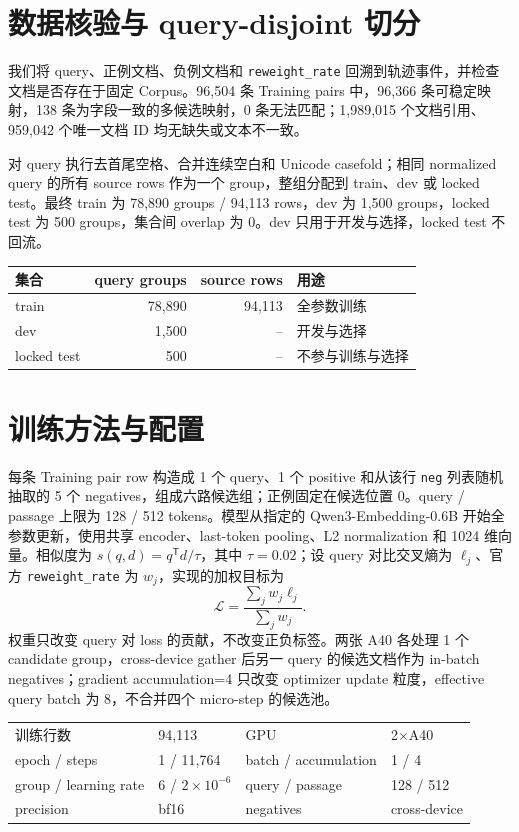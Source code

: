 \documentclass[UTF8,a4paper,10pt]{ctexart}
\begin{document}
\section{数据核验与 query-disjoint 切分}
我们将 query、正例文档、负例文档和 \texttt{reweight\_rate} 回溯到轨迹事件，并检查文档是否存在于固定 Corpus。96,504 条 Training pairs 中，96,366 条可稳定映射，138 条为字段一致的多候选映射，0 条无法匹配；1,989,015 个文档引用、959,042 个唯一文档 ID 均无缺失或文本不一致。

对 query 执行去首尾空格、合并连续空白和 Unicode casefold；相同 normalized query 的所有 source rows 作为一个 group，整组分配到 train、dev 或 locked test。最终 train 为 78,890 groups / 94,113 rows，dev 为 1,500 groups，locked test 为 500 groups，集合间 overlap 为 0。dev 只用于开发与选择，locked test 不回流。

\begin{center}
\small
\begin{tabular}{lrrl}
\toprule
集合 & query groups & source rows & 用途 \\
\midrule
train & 78,890 & 94,113 & 全参数训练 \\
dev & 1,500 & -- & 开发与选择 \\
locked test & 500 & -- & 不参与训练与选择 \\
\bottomrule
\end{tabular}
\end{center}

\section{训练方法与配置}
每条 Training pair row 构造成 1 个 query、1 个 positive 和从该行 \texttt{neg} 列表随机抽取的 5 个 negatives，组成六路候选组；正例固定在候选位置 0。query / passage 上限为 128 / 512 tokens。模型从指定的 Qwen3-Embedding-0.6B 开始全参数更新，使用共享 encoder、last-token pooling、L2 normalization 和 1024 维向量。相似度为 $s(q,d)=q^{\mathsf T}d/\tau$，其中 $\tau=0.02$；设 query 对比交叉熵为 $\ell_j$、官方 \texttt{reweight\_rate} 为 $w_j$，实现的加权目标为
\[
\mathcal{L}=\frac{\sum_j w_j\ell_j}{\sum_j w_j}.
\]
权重只改变 query 对 loss 的贡献，不改变正负标签。两张 A40 各处理 1 个 candidate group，cross-device gather 后另一 query 的候选文档作为 in-batch negatives；gradient accumulation=4 只改变 optimizer update 粒度，effective query batch 为 8，不合并四个 micro-step 的候选池。

\begin{center}
\small
\begin{tabular}{llll}
\toprule
训练行数 & 94,113 & GPU & 2$\times$A40 \\
epoch / steps & 1 / 11,764 & batch / accumulation & 1 / 4 \\
group / learning rate & 6 / $2\times10^{-6}$ & query / passage & 128 / 512 \\
precision & bf16 & negatives & cross-device \\
\bottomrule
\end{tabular}
\end{center}
\end{document}
